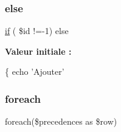 \subsubsection{\texorpdfstring{else}{else}}
{\footnotesize\ttfamily \hyperlink{_v__menu_8php_ac81b1d41ce3949361fdb64fac6891d95}{if} ( \$id !=-\/1) else}

{\bfseries Valeur initiale \+:}
\begin{DoxyCode}
\{
                echo \textcolor{stringliteral}{'Ajouter'}
\end{DoxyCode}
\mbox{\label{v__add_parcours_8php_a2672092e92dffec571cd13028a6d9029}} 
\subsubsection{\texorpdfstring{foreach}{foreach}}
{\footnotesize\ttfamily foreach(\$precedences as \$row)}

